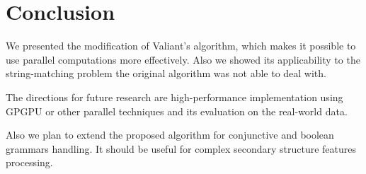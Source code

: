 \section{\bf Conclusion}

We presented the modification of Valiant's algorithm, which makes it possible to use parallel computations more effectively. 
Also we showed its applicability to the string-matching problem the original algorithm was not able to deal with.

The directions for future research are high-performance implementation using GPGPU or other parallel techniques and its evaluation on the real-world data.

Also we plan to extend the proposed algorithm for conjunctive and boolean grammars handling. It should be useful for complex secondary structure features processing.